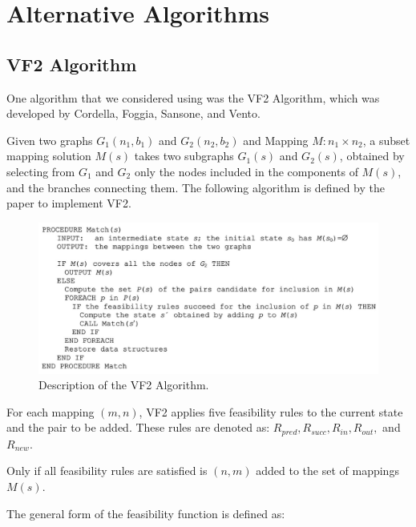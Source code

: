 \documentclass{article}
\begin{document}
\section{Alternative Algorithms}

  \subsection{VF2 Algorithm}

  One algorithm that we considered using was the VF2 Algorithm, which was developed by Cordella, Foggia, Sansone, and Vento.

  Given two graphs $G_1(n_1,b_1)$ and $G_2(n_2,b_2)$ and Mapping $M : n_1 \times n_2$, a subset mapping solution $M(s)$ takes two subgraphs $G_1(s)$ and $G_2(s)$, obtained by selecting from $G_1$ and $G_2$
  only the nodes included in the components of $M(s)$, and the branches connecting them.
  The following algorithm is defined by the paper to implement VF2.

  \begin{figure}[H]
    \centering
    \includegraphics[scale=0.7]{images/vf2_rules.png}
    \caption{Description of the VF2 Algorithm.}
    \label{fig:vf2algo}
  \end{figure}

  For each mapping $(m,n)$, VF2 applies five feasibility rules to the current state and the pair to be added. These rules are denoted as: $R_{pred}, R_{succ}, R_{in}, R_{out},$ and $R_{new}$.

  Only if all feasibility rules are satisfied is $(n,m)$ added to the set of mappings $M(s)$.

  The general form of the feasibility function is defined as:
\end{document}
